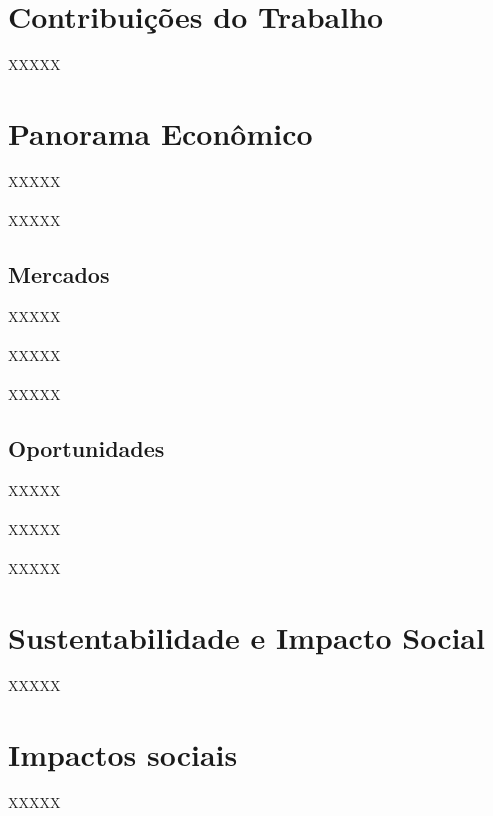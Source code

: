 \section{Contribuições do Trabalho}

XXXXX

\section{Panorama Econômico}
XXXXX
\\\\
XXXXX

\subsection{Mercados}

XXXXX
\\\\
XXXXX
\\\\
XXXXX

\subsection{Oportunidades}

XXXXX
\\\\
XXXXX
\\\\
XXXXX


\section{Sustentabilidade e Impacto Social}

XXXXX




\section{Impactos sociais}

XXXXX
